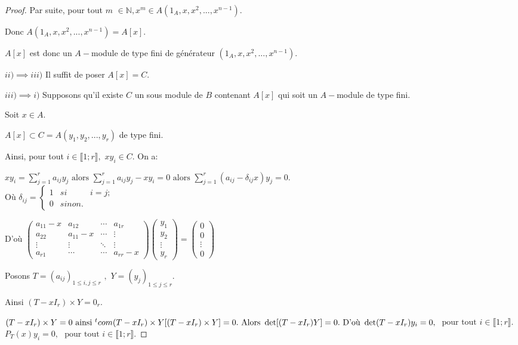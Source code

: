 \begin{proof}
	Par suite, pour tout $m$ $\in \mathbb{N},x^{m}\in A(1_A,x,x^{2},...,x^{n-1}).$
	
	Donc $A(1_A,x,x^{2},...,x^{n-1})=A[x]$.
	
	$A[x]$ est donc un $A-$module de type fini de générateur $
	(1_A,x,x^{2},...,x^{n-1}).$
	
	$ii)\implies iii)$ Il suffit de poser $A[x]=C$.
	
	$iii)\implies i)$ Supposons qu'il existe $C$ un sous module de $B$ contenant $A[x]$ qui soit un $A-$module de type fini.
	
	Soit $x\in A.$
	
	$A[x]\subset C=A(y_{1},y_{2},...,y_{r})$ de type fini.
	
	Ainsi, pour tout $i\in \llbracket 1; r \rrbracket ,$ $xy_{i}\in C.$ On
	a:
	
	$xy_{i}=\sum\limits_{j=1}^{r}a_{ij}y_{j}\text{ alors }
	\sum\limits_{j=1}^{r}a_{ij}y_{j}-xy_{i}=0\text{ alors }
	\sum\limits_{j=1}^{r}(a_{ij}-\delta _{ij}x)y_{j}=0$. \\Où $\delta_{ij}=\left\{ 
	\begin{array}{ccc}
		1 & { si } & i=j; \\ 
		0 & { sinon}.
	\end{array}
	\right. $
	
	D'où $\left( 
	\begin{array}{cccc}
		a_{11}-x & a_{12} & \cdots & a_{1r} \\ 
		a_{22} & a_{11}-x & \cdots& \vdots\\ 
		\vdots & \vdots& \ddots  & \vdots\\ 
		a_{r1} & \cdots & \cdots & a_{rr}-x
	\end{array}
	\right) \left( 
	\begin{array}{c}
		y_{1} \\ 
		y_{2} \\ 
		\vdots \\ 
		y_{r}
	\end{array}
	\right) =\left( 
	\begin{array}{c}
		0 \\ 
		0 \\ 
		\vdots\\ 
		0
	\end{array}
	\right) $
	
	Posons $T=(a_{ij})_{1\leq i,j\leq r}$ $,$ $Y=(y_{j})_{1\leq j\leq r}$. 
	
	Ainsi $(T-xI_{r})\times Y=0_{r}.$
	
	$(T-xI_{r})\times Y=0 \text{ ainsi } {^{t}com}(T-xI_{r})\times Y[(T-xI_{r})\times Y]=0. \\ 
	\text{ Alors } \det [(T-xI_{r})Y]=0. \\
	\text{ D'où } \det(T-xI_{r})y_{i}=0,$ $\text{ pour tout } i\in \llbracket 1; r \rrbracket $. 
	\\$P_{T}(x)y_{i}=0,$ $\text{ pour tout } i\in \llbracket 1; r \rrbracket.$
	

\end{proof}
